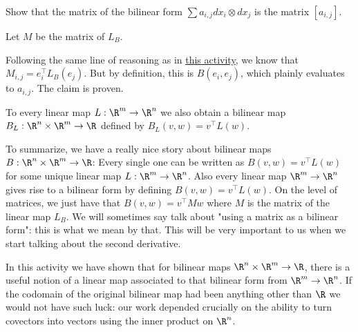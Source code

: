 \documentclass{ximera}
\begin{document}
	Show that the matrix of the bilinear form $\sum a_{i,j} dx_i \otimes dx_j$ is the matrix $[a_{i,j}]$.
	
	\begin{free-response}
		Let $M$ be the matrix of $L_B$.
		
		Following the same line of reasoning as in \href{http://ximera.osu.edu/course/kisonecat/m2o2c2/course/activity/week1/inner-product/multiply-dot/}{this activity}, we 
		know that $M_{i,j} = e_i^\top L_B(e_j)$.  But by definition, this is 	$B(e_i,e_j)$, which plainly evaluates to $a_{i,j}$.   The claim is proven.
	\end{free-response}
	
	To every linear map  $L:\R^m \to \R^n$ we also obtain a bilinear map $B_L : \R^n \times \R^m \to \R$ defined by $B_L(v,w) = v^\top L(w)$.
	
	To summarize, we have a really nice story about bilinear maps $B:\R^n \times \R^m \to \R$:  Every single one can be written as $B(v,w) = v^\top L(w)$ for some 
	unique linear map $L:\R^m \to \R^n$. Also every linear map $\R^m \to \R^n$ gives rise to a bilinear form by defining $B(v,w) = v^\top L(w)$.  On the level of matrices,
	we just have that $B(v,w) = v^\top M w $ where $M$ is the matrix of the linear map $L_B$.  We will sometimes say talk about "using a matrix as a bilinear form":  this is what we
	mean by that.  This will be very important to us when we start talking about the second derivative.
	
	In this activity we have shown that for bilinear maps $\R^n \times \R^m \to \R$, there is a useful notion of a linear map associated to that bilinear form from 
	$\R^m \to \R^n$.  If the codomain of the original bilinear map had been anything other than $\R$ we would not have such luck: our work depended crucially on
	the ability to turn covectors into vectors using the inner product on $\R^n$.
	
	
\end{document}
